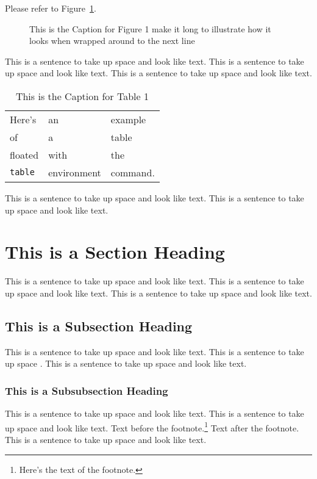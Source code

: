 Please refer to Figure~\ref{myfig}.  %

\begin{figure}
\centering
\vspace{2.0in} %
\caption{This is the Caption for Figure 1 make it long to illustrate
how it looks when wrapped around to the next line}
\label{myfig}  %
\end{figure}

This is a sentence to take up space and look like text.
This is a sentence to take up space and look like text.
This is a sentence to take up space and look like text.

\begin{table}
\caption[This is the Caption for Table 1]
            {This is the Caption for Table 1\cite{thisbook}}
\begin{center}
\begin{tabular}{lll}
Here's       & an          & example  \\
of           & a           & table    \\
floated      & with        & the      \\
\verb+table+ & environment & command.
\end{tabular}
\end{center}
\end{table}

This is a sentence to take up space and look like text.
This is a sentence to take up space and look like text.

\section{This is a Section Heading}

This is a sentence to take up space and look like text.
This is a sentence to take up space and look like text.
This is a sentence to take up space and look like text.

\subsection{This is a Subsection Heading}

This is a sentence to take up space and look like text.
This is a sentence to take up space \cite{anotherbook}.
This is a sentence to take up space and look like text.

\subsubsection{This is a Subsubsection Heading}
This is a sentence to take up space and look like text.
This is a sentence to take up space and look like text.
Text before the footnote.\footnote{Here's the text of the footnote.}
Text after the footnote.
This is a sentence to take up space and look like text.

